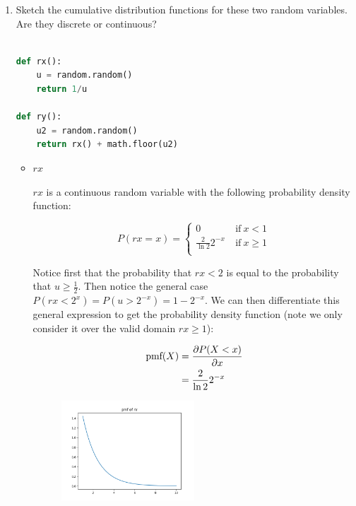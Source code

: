 \documentclass[10pt,\jkfside,a4paper]{article}
\begin{document}
\begin{enumerate}[label=\arabic*]
\begin{itemize}
\end{itemize}

\item Sketch the cumulative distribution functions for these two random
variables. Are they discrete or continuous?

\begin{lstlisting}[language=Python]

def rx():
	u = random.random()
	return 1/u

def ry():
	u2 = random.random()
	return rx() + math.floor(u2)

\end{lstlisting}

\begin{itemize}

\item $rx$

$rx$ is a continuous random variable with the following probability density
function:

\[
P(rx = x) =
\begin{cases}
0 & \ \text{if} \ x < 1 \\
\frac{2}{\ln 2} 2^{-x} & \ \text{if} \ x \geq 1 \\
\end{cases}
\]

Notice first that the probability that $rx < 2$ is equal to the probability
that $u \geq \frac{1}{2}$. Then notice the general case $P\left(rx <
2^x\right) = P\left(u > 2^{-x}\right) = 1 - 2^{-x}$. We can then
differentiate this general expression to get the probability density
function (note we only consider it over the valid domain $rx \geq 1$):

\[
\begin{split}
\text{pmf}(X) &= \pdv{P(X < x)}{x} \\
&= \frac{2}{\ln 2} 2^{-x} \\
\end{split}
\]

\begin{figure}[H]
\centering
\includegraphics[width=0.5\textwidth]{./q16_rx_img}
\end{figure}


\end{itemize}
\end{enumerate}
\end{document}
